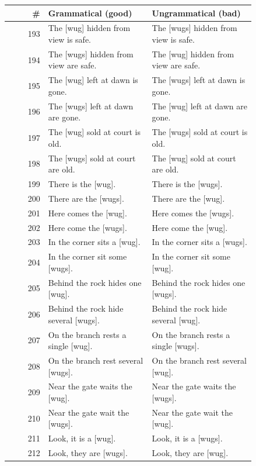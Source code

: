 \begin{table}[p]
\centering
\footnotesize
\begin{tabular}{@{}rp{0.42\linewidth}p{0.42\linewidth}@{}}
\hline
\# & Grammatical (good) & Ungrammatical (bad) \\
\hline
193 & The {[}wug{]} hidden from view is safe. & The {[}wugs{]} hidden from view is safe. \\
194 & The {[}wugs{]} hidden from view are safe. & The {[}wug{]} hidden from view are safe. \\
195 & The {[}wug{]} left at dawn is gone. & The {[}wugs{]} left at dawn is gone. \\
196 & The {[}wugs{]} left at dawn are gone. & The {[}wug{]} left at dawn are gone. \\
197 & The {[}wug{]} sold at court is old. & The {[}wugs{]} sold at court is old. \\
198 & The {[}wugs{]} sold at court are old. & The {[}wug{]} sold at court are old. \\
199 & There is the {[}wug{]}. & There is the {[}wugs{]}. \\
200 & There are the {[}wugs{]}. & There are the {[}wug{]}. \\
201 & Here comes the {[}wug{]}. & Here comes the {[}wugs{]}. \\
202 & Here come the {[}wugs{]}. & Here come the {[}wug{]}. \\
203 & In the corner sits a {[}wug{]}. & In the corner sits a {[}wugs{]}. \\
204 & In the corner sit some {[}wugs{]}. & In the corner sit some {[}wug{]}. \\
205 & Behind the rock hides one {[}wug{]}. & Behind the rock hides one {[}wugs{]}. \\
206 & Behind the rock hide several {[}wugs{]}. & Behind the rock hide several {[}wug{]}. \\
207 & On the branch rests a single {[}wug{]}. & On the branch rests a single {[}wugs{]}. \\
208 & On the branch rest several {[}wugs{]}. & On the branch rest several {[}wug{]}. \\
209 & Near the gate waits the {[}wug{]}. & Near the gate waits the {[}wugs{]}. \\
210 & Near the gate wait the {[}wugs{]}. & Near the gate wait the {[}wug{]}. \\
211 & Look, it is a {[}wug{]}. & Look, it is a {[}wugs{]}. \\
212 & Look, they are {[}wugs{]}. & Look, they are {[}wug{]}. \\

\end{tabular}
\end{table}
